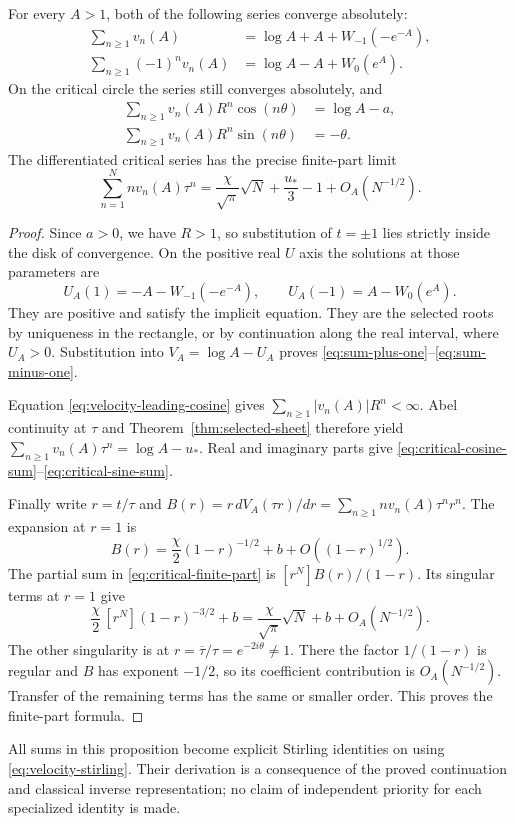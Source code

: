 \begin{proposition}
\label{prop:velocity-summations}
For every $A>1$, both of the following series converge absolutely:
\begin{align}
 \sum_{n\geq1}v_n(A)
    &=\log A+A+W_{-1}(-e^{-A}),
                       \label{eq:sum-plus-one}\\
 \sum_{n\geq1}(-1)^n v_n(A)
    &=\log A-A+W_0(e^A).
                       \label{eq:sum-minus-one}
\end{align}
On the critical circle the series still converges absolutely, and
\begin{align}
 \sum_{n\geq1}v_n(A)R^n\cos(n\theta)&=\log A-a,
                           \label{eq:critical-cosine-sum}\\
 \sum_{n\geq1}v_n(A)R^n\sin(n\theta)&=-\theta.
                           \label{eq:critical-sine-sum}
\end{align}
The differentiated critical series has the precise finite-part limit
\begin{equation}\label{eq:critical-finite-part}
 \sum_{n=1}^N n v_n(A)\tau^n
   =\frac{\chi}{\sqrt\pi}\sqrt N+\frac{u_*}{3}-1
                  +O_A(N^{-1/2}).
\end{equation}
\end{proposition}

\begin{proof}
Since $a>0$, we have $R>1$, so substitution of $t=\pm1$ lies strictly
inside the disk of convergence.  On the positive real $U$ axis the
solutions at those parameters are
\[
 U_A(1)=-A-W_{-1}(-e^{-A}),\qquad
 U_A(-1)=A-W_0(e^A).
\]
They are positive and satisfy the implicit equation.  They are the
selected roots by uniqueness in the rectangle, or by continuation along
the real interval, where $U_A>0$.  Substitution into $V_A=\log A-U_A$
proves \eqref{eq:sum-plus-one}--\eqref{eq:sum-minus-one}.

Equation \eqref{eq:velocity-leading-cosine} gives
$\sum_{n\geq1}|v_n(A)|R^n<\infty$.  Abel continuity at $\tau$ and
Theorem~\ref{thm:selected-sheet} therefore yield
$\sum_{n\geq1}v_n(A)\tau^n=\log A-u_*$.  Real and imaginary parts
give \eqref{eq:critical-cosine-sum}--\eqref{eq:critical-sine-sum}.

Finally write $r=t/\tau$ and
$B(r)=r\,dV_A(\tau r)/dr=\sum_{n\geq1}nv_n(A)\tau^n r^n$.
The expansion at $r=1$ is
\[
 B(r)=\frac\chi2(1-r)^{-1/2}+b+O((1-r)^{1/2}).
\]
The partial sum in \eqref{eq:critical-finite-part} is
$[r^N]B(r)/(1-r)$.  Its singular terms at $r=1$ give
\[
 \frac\chi2\,[r^N](1-r)^{-3/2}+b
     =\frac\chi{\sqrt\pi}\sqrt N+b+O_A(N^{-1/2}).
\]
The other singularity is at $r=\overline\tau/\tau=e^{-2i\theta}\neq1$.
There the factor $1/(1-r)$ is regular and $B$ has exponent $-1/2$,
so its coefficient contribution is $O_A(N^{-1/2})$.  Transfer of the
remaining terms has the same or smaller order.  This proves the
finite-part formula.
\end{proof}

All sums in this proposition become explicit Stirling identities on
using \eqref{eq:velocity-stirling}.  Their derivation is a consequence
of the proved continuation and classical inverse representation;
no claim of independent priority for each specialized identity is made.
